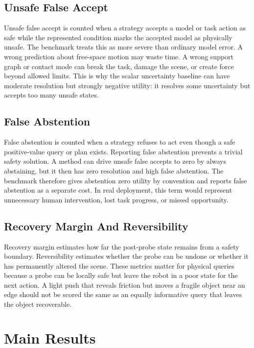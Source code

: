 \documentclass{article}
\begin{document}
\subsection{Unsafe False Accept}

Unsafe false accept is counted when a strategy accepts a model or task action as safe while the represented condition marks the accepted model as physically unsafe. The benchmark treats this as more severe than ordinary model error. A wrong prediction about free-space motion may waste time. A wrong support graph or contact mode can break the task, damage the scene, or create force beyond allowed limits. This is why the scalar uncertainty baseline can have moderate resolution but strongly negative utility: it resolves some uncertainty but accepts too many unsafe states.

\subsection{False Abstention}

False abstention is counted when a strategy refuses to act even though a safe positive-value query or plan exists. Reporting false abstention prevents a trivial safety solution. A method can drive unsafe false accepts to zero by always abstaining, but it then has zero resolution and high false abstention. The benchmark therefore gives abstention zero utility by convention and reports false abstention as a separate cost. In real deployment, this term would represent unnecessary human intervention, lost task progress, or missed opportunity.

\subsection{Recovery Margin And Reversibility}

Recovery margin estimates how far the post-probe state remains from a safety boundary. Reversibility estimates whether the probe can be undone or whether it has permanently altered the scene. These metrics matter for physical queries because a probe can be locally safe but leave the robot in a poor state for the next action. A light push that reveals friction but moves a fragile object near an edge should not be scored the same as an equally informative query that leaves the object recoverable.

\section{Main Results}
\end{document}
